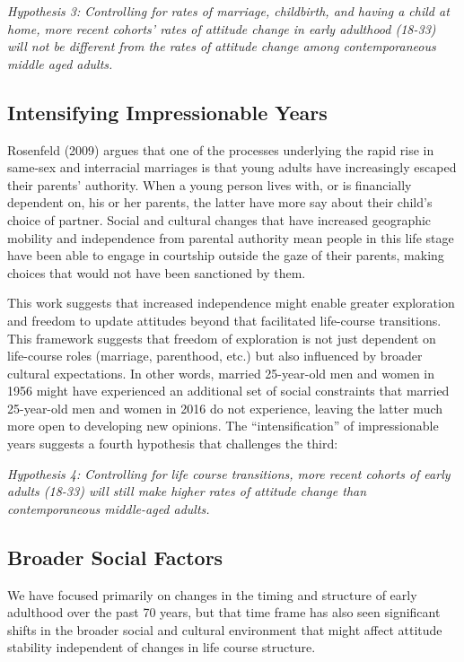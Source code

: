 \documentclass[
  12pt,
]{article}
\begin{document}
\emph{Hypothesis 3: Controlling for rates of marriage, childbirth, and having a child at home, more recent cohorts' rates of attitude change in early adulthood (18-33) will not be different from the rates of attitude change among contemporaneous middle aged adults.}

\hypertarget{intensifying-impressionable-years}{%
\subsection{Intensifying Impressionable Years}\label{intensifying-impressionable-years}}

Rosenfeld (2009) argues that one of the processes underlying the rapid rise in same-sex and interracial marriages is that young adults have increasingly escaped their parents' authority. When a young person lives with, or is financially dependent on, his or her parents, the latter have more say about their child's choice of partner. Social and cultural changes that have increased geographic mobility and independence from parental authority mean people in this life stage have been able to engage in courtship outside the gaze of their parents, making choices that would not have been sanctioned by them.

This work suggests that increased independence might enable greater exploration and freedom to update attitudes beyond that facilitated life-course transitions. This framework suggests that freedom of exploration is not just dependent on life-course roles (marriage, parenthood, etc.) but also influenced by broader cultural expectations. In other words, married 25-year-old men and women in 1956 might have experienced an additional set of social constraints that married 25-year-old men and women in 2016 do not experience, leaving the latter much more open to developing new opinions. The ``intensification'' of impressionable years suggests a fourth hypothesis that challenges the third:

\emph{Hypothesis 4: Controlling for life course transitions, more recent cohorts of early adults (18-33) will still make higher rates of attitude change than contemporaneous middle-aged adults.}

\hypertarget{broader-social-factors}{%
\subsection{Broader Social Factors}\label{broader-social-factors}}

We have focused primarily on changes in the timing and structure of early adulthood over the past 70 years, but that time frame has also seen significant shifts in the broader social and cultural environment that might affect attitude stability independent of changes in life course structure.
\end{document}
